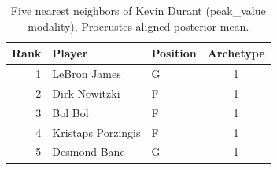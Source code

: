 \begin{table}[htbp]
  \centering\small
  \begin{tabular}{rllc}
    \toprule
    Rank & Player & Position & Archetype \\
    \midrule
    1 & LeBron James & G & 1 \\
    2 & Dirk Nowitzki & F & 1 \\
    3 & Bol Bol & F & 1 \\
    4 & Kristaps Porzingis & F & 1 \\
    5 & Desmond Bane & G & 1 \\
    \bottomrule
  \end{tabular}
  \caption{Five nearest neighbors of Kevin Durant (peak_value modality), Procrustes-aligned posterior mean.}
  \label{tab:Kevin_Durant_neighbors_peak_value}
\end{table}

